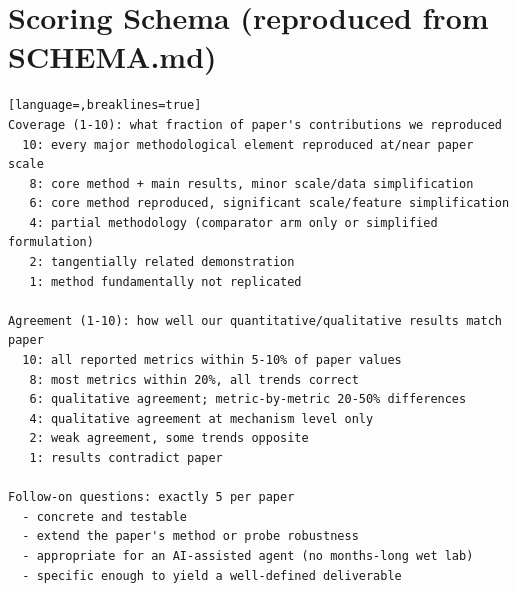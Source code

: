 \appendix
\section{Scoring Schema (reproduced from SCHEMA.md)}
\begin{lstlisting}[language=,breaklines=true]
Coverage (1-10): what fraction of paper's contributions we reproduced
  10: every major methodological element reproduced at/near paper scale
   8: core method + main results, minor scale/data simplification
   6: core method reproduced, significant scale/feature simplification
   4: partial methodology (comparator arm only or simplified formulation)
   2: tangentially related demonstration
   1: method fundamentally not replicated

Agreement (1-10): how well our quantitative/qualitative results match paper
  10: all reported metrics within 5-10% of paper values
   8: most metrics within 20%, all trends correct
   6: qualitative agreement; metric-by-metric 20-50% differences
   4: qualitative agreement at mechanism level only
   2: weak agreement, some trends opposite
   1: results contradict paper

Follow-on questions: exactly 5 per paper
  - concrete and testable
  - extend the paper's method or probe robustness
  - appropriate for an AI-assisted agent (no months-long wet lab)
  - specific enough to yield a well-defined deliverable
\end{lstlisting}

